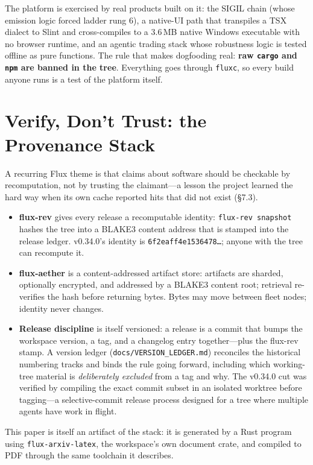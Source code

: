 The platform is exercised by real products built on it: the SIGIL chain (whose emission logic forced ladder rung 6), a native-UI path that transpiles a TSX dialect to Slint and cross-compiles to a 3.6\,MB native Windows executable with no browser runtime, and an agentic trading stack whose robustness logic is tested offline as pure functions. The rule that makes dogfooding real: \textbf{raw \texttt{cargo} and \texttt{npm} are banned in the tree}. Everything goes through \texttt{fluxc}, so every build anyone runs is a test of the platform itself.


\section{Verify, Don't Trust: the Provenance Stack}

A recurring Flux theme is that claims about software should be checkable by recomputation, not by trusting the claimant---a lesson the project learned the hard way when its own cache reported hits that did not exist (\S7.3).

\begin{itemize}
\item \textbf{flux-rev} gives every release a recomputable identity: \texttt{flux-rev snapshot} hashes the tree into a BLAKE3 content address that is stamped into the release ledger. v0.34.0's identity is \texttt{6f2eaff4e1536478\ldots}; anyone with the tree can recompute it.
\item \textbf{flux-aether} is a content-addressed artifact store: artifacts are sharded, optionally encrypted, and addressed by a BLAKE3 content root; retrieval re-verifies the hash before returning bytes. Bytes may move between fleet nodes; identity never changes.
\item \textbf{Release discipline} is itself versioned: a release is a commit that bumps the workspace version, a tag, and a changelog entry together---plus the flux-rev stamp. A version ledger (\texttt{docs/VERSION\_LEDGER.md}) reconciles the historical numbering tracks and binds the rule going forward, including which working-tree material is \emph{deliberately excluded} from a tag and why. The v0.34.0 cut was verified by compiling the exact commit subset in an isolated worktree before tagging---a selective-commit release process designed for a tree where multiple agents have work in flight.
\end{itemize}

This paper is itself an artifact of the stack: it is generated by a Rust program using \texttt{flux-arxiv-latex}, the workspace's own document crate, and compiled to PDF through the same toolchain it describes.



